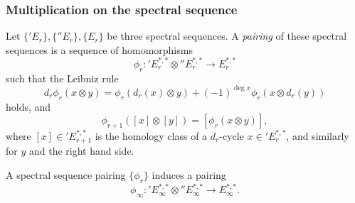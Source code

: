 \documentclass{MetricNotes2023}
\DeclareMathOperator{\Ext}{Ext}
\begin{document}
\subsubsection{Multiplication on the spectral sequence}

\begin{definition}
Let \(\{'E_r\}, \{''E_r\}, \{E_r\}\) be three spectral sequences. A \textit{pairing} of these spectral sequences is a sequence of homomorphisms 
\[\phi_r : \text{}'E_r^{*,*}\otimes \text{}''E_r^{*,*} \to E_r^{*,*}\]
such that the Leibniz rule
\[d_r\phi_r(x\otimes y)=\phi_r(d_r(x)\otimes y)+(-1)^{\deg x}\phi_r(x\otimes d_r(y))\]
holds, and
\[\phi_{r+1}([x]\otimes[y])=[\phi_r(x\otimes y)],\]
where \([x]\in \text{}'E_{r+1}^{*,*}\) is the homology class of a \(d_r\)-cycle \(x\in \text{}'E_r^{*,*}\), and similarly for \(y\) and the right hand side. 
\end{definition}

A spectral sequence pairing \(\{\phi_r\}\) induces a pairing 
\[\phi_\infty : \text{}'E_\infty^{*,*}\otimes \text{}''E^{*,*}_\infty \to E^{*,*}_\infty.\]



\end{document}
